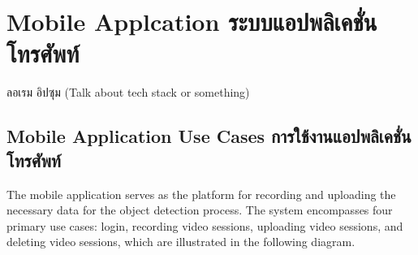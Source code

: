\section{\ifenglish Mobile Applcation \else ระบบแอปพลิเคชั่นโทรศัพท์ \fi}
\ifenglish
\else
ลอเรม อิปซุม (Talk about tech stack or something)
    
\fi
\subsection{\ifenglish Mobile Application Use Cases \else การใช้งานแอปพลิเคชั่นโทรศัพท์ \fi}
The mobile application serves as the platform for recording and uploading the necessary data for the object detection process. The system encompasses four primary use cases: login, recording video sessions, uploading video sessions, and deleting video sessions, which are illustrated in the following diagram.
